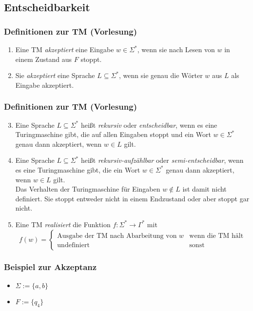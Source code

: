 \subsection{Entscheidbarkeit}
\begin{frame}
 \frametitle{Definitionen zur TM (Vorlesung)}
 \begin{enumerate}
  \item Eine TM \emph{akzeptiert} eine Eingabe $w \in \Sigma^*$, wenn sie nach Lesen von $w$ in einem Zustand aus $F$ stoppt.
  \item Sie \emph{akzeptiert} eine Sprache $L \subseteq \Sigma^*$, wenn sie genau die Wörter $w$ aus $L$ als Eingabe akzeptiert.
\end{enumerate}
\end{frame}
\begin{frame}
 \frametitle{Definitionen zur TM (Vorlesung)}
 \begin{enumerate}
 \setcounter{enumi}{2}
 \item Eine Sprache $L \subseteq \Sigma^*$ heißt \emph{rekursiv} oder \emph{entscheidbar}, wenn es eine Turingmaschine gibt, die auf allen Eingaben stoppt und
	ein Wort $w \in \Sigma^*$ genau dann akzeptiert, wenn $w \in L$ gilt.
  \item Eine Sprache $L \subseteq \Sigma^*$ heißt \emph{rekursiv-aufzählbar} oder \emph{semi-entscheidbar}, wenn es eine Turingmaschine gibt, die ein Wort $w \in \Sigma^*$ genau dann akzeptiert, wenn $w \in L$ gilt. \\ Das Verhalten der Turingmaschine für Eingaben $w \not\in L$ ist damit nicht definiert.
	Sie stoppt entweder nicht in einem Endzustand oder aber stoppt gar nicht.
	\item Eine TM \emph{realisiert} die Funktion $f: \Sigma^* \rightarrow \Gamma^*$ mit $$f(w) = \begin{cases} \text{Ausgabe der TM nach Abarbeitung von } w & \text{wenn die TM hält} \\ \text{undefiniert} & \text{sonst} \end{cases}$$
 \end{enumerate}
\end{frame}

\begin{frame}
 \frametitle{Beispiel zur Akzeptanz}
 \begin{itemize}
  \item $\Sigma := \{a, b\}$  
  \item $F := \{q_4\}$
  
  \ducttape{-1cm} 
  \thetm
 \end{itemize}
 
 \end{frame}

